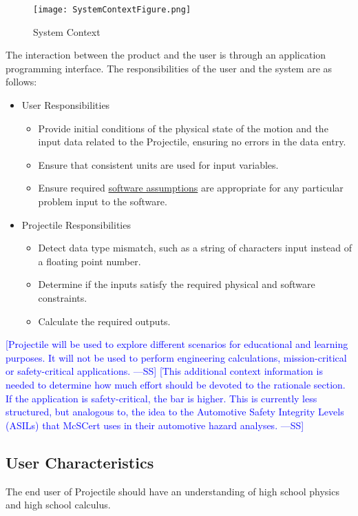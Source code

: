 \documentclass[12pt]{article}
\newcommand{\authornote}[3]{\textcolor{#1}{[#3 ---#2]}}
\newcommand{\authornote}[3]{}
\newcommand{\wss}[1]{\authornote{blue}{SS}{#1}}
\begin{document}
\begin{figure}
\begin{center}
\texttt{[image: SystemContextFigure.png]}
\caption{System Context}
\label{Figure:sysCtxDiag}
\end{center}
\end{figure}
The interaction between the product and the user is through an application programming interface. The responsibilities of the user and the system are as follows:

\begin{itemize}
\item{User Responsibilities}
\begin{itemize}
\item{Provide initial conditions of the physical state of the motion and the input data related to the Projectile, ensuring no errors in the data entry.}
\item{Ensure that consistent units are used for input variables.}
\item{Ensure required \hyperref[Sec:Assumps]{software assumptions} are appropriate for any particular problem input to the software.}
\end{itemize}
\item{Projectile Responsibilities}
\begin{itemize}
\item{Detect data type mismatch, such as a string of characters input instead of a floating point number.}
\item{Determine if the inputs satisfy the required physical and software constraints.}
\item{Calculate the required outputs.}
\end{itemize}
\end{itemize}

\wss{Projectile will be used to explore different scenarios for educational and
learning purposes. It will not be used to perform engineering calculations,
mission-critical or safety-critical applications.} \wss{This additional context
information is needed to determine how much effort should be devoted to the
rationale section.  If the application is safety-critical, the bar is higher.
This is currently less structured, but analogous to, the idea to the Automotive
Safety Integrity Levels (ASILs) that McSCert uses in their automotive hazard
analyses.}

\subsection{User Characteristics}
\label{Sec:UserChars}
The end user of Projectile should have an understanding of high school physics and high school calculus.
\end{document}
